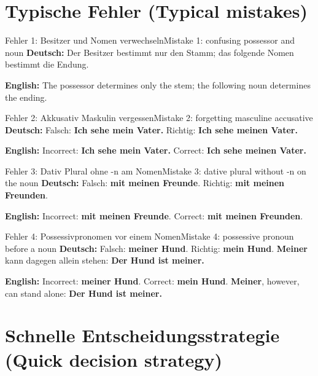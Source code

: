 \documentclass[a4paper,11pt]{article}
\newcommand{\GermanText}[1]{\textbf{Deutsch: }#1\par}
\newcommand{\EnglishText}[1]{{\small\color{SoftGray}\textbf{English: }#1\par}}
\begin{document}
\section{Typische Fehler \textnormal{(Typical mistakes)}}

\begin{grammarentry}{Fehler 1: Besitzer und Nomen verwechseln}{Mistake 1: confusing possessor and noun}
\GermanText{Der Besitzer bestimmt nur den Stamm; das folgende Nomen bestimmt die Endung.}
\EnglishText{The possessor determines only the stem; the following noun determines the ending.}
\end{grammarentry}

\begin{grammarentry}{Fehler 2: Akkusativ Maskulin vergessen}{Mistake 2: forgetting masculine accusative}
\GermanText{Falsch: \textbf{Ich sehe mein Vater.} Richtig: \textbf{Ich sehe meinen Vater.}}
\EnglishText{Incorrect: \textbf{Ich sehe mein Vater.} Correct: \textbf{Ich sehe meinen Vater.}}
\end{grammarentry}

\begin{grammarentry}{Fehler 3: Dativ Plural ohne -n am Nomen}{Mistake 3: dative plural without -n on the noun}
\GermanText{Falsch: \textbf{mit meinen Freunde}. Richtig: \textbf{mit meinen Freunden}.}
\EnglishText{Incorrect: \textbf{mit meinen Freunde}. Correct: \textbf{mit meinen Freunden}.}
\end{grammarentry}

\begin{grammarentry}{Fehler 4: Possessivpronomen vor einem Nomen}{Mistake 4: possessive pronoun before a noun}
\GermanText{Falsch: \textbf{meiner Hund}. Richtig: \textbf{mein Hund}. \textbf{Meiner} kann dagegen allein stehen: \textbf{Der Hund ist meiner.}}
\EnglishText{Incorrect: \textbf{meiner Hund}. Correct: \textbf{mein Hund}. \textbf{Meiner}, however, can stand alone: \textbf{Der Hund ist meiner.}}
\end{grammarentry}

\section{Schnelle Entscheidungsstrategie \textnormal{(Quick decision strategy)}}
\end{document}

